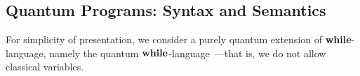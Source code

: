 \documentclass[conference,compsoc, 10pt]{IEEEtran}
\newcommand{\jh}[1]{\textit{\color{red}[JH] : #1}}
\newcommand{\lz}[1]{\textit{\color{blue}[LZ] : #1}}
\newtheorem{proposition}{Proposition}[section]
\newcommand {\qbar} {{\overline{q}}}
\newcommand {\cD } {{\mathcal{D}}}
\newcommand {\cH } {{\mathcal{H}}}
\newcommand {\dom }[1] {{\mathsf{dom}\!\left(#1\right)}}
\newcommand {\rt }[2] {{\left.{#1}\right|_{#2}}}
\newcommand {\tr } {{\mathrm{tr}}}
\newcommand {\vars } {\mathbf{V}}
\def\>{\ensuremath{\rangle}}
\def\<{\ensuremath{\langle}}
\newcommand {\swap} {\mathrm{SWAP}}
\newcommand {\perm} {\mathbf{Perm}}
\providecommand{\todo}[1]{{\protect\color{red}\noindent {\bf [todo]}\emph{#1} {\bf [/todo]}}}
\begin{document}
	\subsection{Quantum Programs: Syntax and Semantics}
	
	For simplicity of presentation, we consider a purely quantum
        extension of \textbf{while}-language, namely the quantum
        ${\bf while}$-language~\cite{Ying11}---that is, we do not
        allow classical variables.

\end{document}
